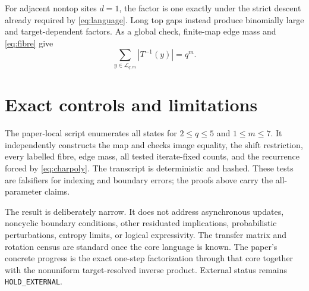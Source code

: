 \documentclass[a4paper,10pt]{amsart}
\theoremstyle{remark}
\newcommand{\Lcal}{\mathcal L}
\begin{document}
For adjacent nontop sites $d=1$, the factor is one exactly under the strict
descent already required by \eqref{eq:language}.  Long top gaps instead
produce binomially large and target-dependent factors.  As a global check,
finite-map edge mass and \eqref{eq:fibre} give
\begin{equation}\label{eq:mass}
 \sum_{y\in\Lcal_{q,m}}|T^{-1}(y)|=q^m.
\end{equation}

\section{Exact controls and limitations}

The paper-local script enumerates all states for $2\le q\le5$ and
$1\le m\le7$.  It independently constructs the map and checks image
equality, the shift restriction, every labelled fibre, edge mass, all tested
iterate-fixed counts, and the recurrence forced by \eqref{eq:charpoly}.
The transcript is deterministic and hashed.  These tests are falsifiers for
indexing and boundary errors; the proofs above carry the all-parameter
claims.

The result is deliberately narrow.  It does not address asynchronous
updates, noncyclic boundary conditions, other residuated implications,
probabilistic perturbations, entropy limits, or logical expressivity.  The
transfer matrix and rotation census are standard once the core language is
known.  The paper's concrete progress is the exact one-step factorization
through that core together with the nonuniform target-resolved inverse
product.  External status remains \texttt{HOLD\_EXTERNAL}.



\end{document}
